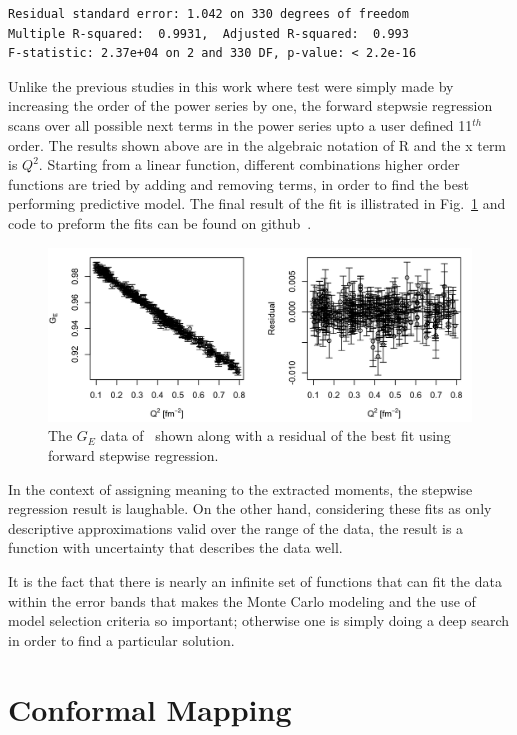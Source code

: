 \documentclass[10pt,aps,prc,twocolumn]{revtex4-1}
\begin{document}
\begin{appendix}
\begin{Verbatim}[fontsize=\footnotesize]
Residual standard error: 1.042 on 330 degrees of freedom
Multiple R-squared:  0.9931,  Adjusted R-squared:  0.993 
F-statistic: 2.37e+04 on 2 and 330 DF, p-value: < 2.2e-16

\end{Verbatim}

Unlike the previous studies in this work where test were simply made by increasing the order of the power series
by one, the forward stepwsie regression scans over all possible next
terms in the power series upto a user defined 11$^{th}$ order.     The results shown above are in the algebraic 
notation of R and the x term is $Q^2$.   Starting from a linear function, different combinations higher order functions
are tried by adding and removing terms, in order to find the best performing predictive model.   The final result
of the fit is illistrated in Fig.~\ref{R-stepwise} and code to preform the fits can be found on github~\cite{Higinbotham:2016github}.

\begin{figure}[htb]
\includegraphics[width=\columnwidth]{Figure/R-stepwise.png}
\caption{The $G_E$ data of~\cite{Griffioen:2015hta} shown along with a residual of the best fit using forward stepwise regression.}
\label{R-stepwise}
\end{figure}

In the context of assigning meaning to the extracted moments, the stepwise regression result is laughable.
On the other hand, considering these fits as only descriptive approximations valid over the range of the data,
the result is a function with uncertainty that describes the data well.

It is the fact that there is nearly an infinite set of functions that can fit the data within the 
error bands that makes the Monte Carlo modeling and the use of model selection criteria so important; otherwise
one is simply doing a deep search in order to find a particular solution. 

\section{Conformal Mapping}


\end{appendix}
\end{document}
